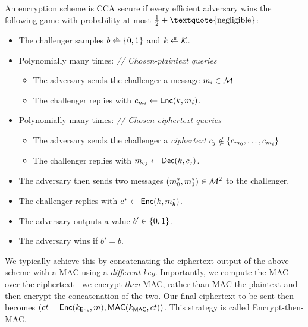 \begin{definition}\label{defn:cca}
	An encryption scheme is CCA secure if every efficient adversary wins the following game with probability at most $\tfrac{1}{2} + \text{\textquote{negligible}}$:

  \begin{itemize}[noitemsep]
		\item The challenger samples $b \rgets \bin$ and $k \rgets \calK$.
    \item Polynomially many times: \quad \emph{// Chosen-plaintext queries}
          \begin{itemize}
            \item The adversary sends the challenger a message $m_i \in \mathcal{M}$
						\item The challenger replies with $c_{m_i} \gets \mathsf{Enc}(k, m_i)$.
          \end{itemize}
    \item Polynomially many times: \quad \emph{// Chosen-ciphertext queries}
          \begin{itemize}
						\item The adversary sends the challenger a \emph{ciphertext} $c_j \notin \left\{ c_{m_0}, \ldots, c_{m_i} \right\}$
						\item The challenger replies with $m_{c_j} \gets \mathsf{Dec}(k, c_j)$.
          \end{itemize}
    \item The adversary then sends two messages $(m^*_0, m^*_1) \in \mathcal{M}^2$ to the challenger.
    \item The challenger replies with $c^* \gets \mathsf{Enc}(k, m^*_b)$.
		\item The adversary outputs a value $b' \in \{0,1\}$.
    \item The adversary wins if $b'=b$. 
	\end{itemize}
\end{definition}



We typically achieve this by concatenating the ciphertext output of the above scheme with a MAC using a \emph{different key}.  Importantly, we compute the MAC over the ciphertext---we encrypt \emph{then} MAC, rather than MAC the plaintext and then encrypt the concatenation of the two. Our final ciphertext to be sent then becomes $(ct = \mathsf{Enc}(k_{\mathsf{Enc}}, m), \mathsf{MAC}(k_{\mathsf{MAC}}, ct))$. This strategy is called Encrypt-then-MAC.

